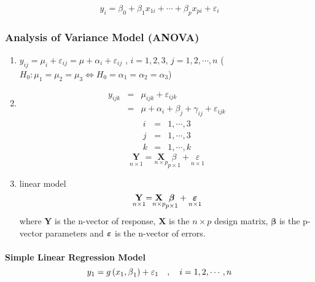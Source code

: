 \documentclass{article}
\begin{document}
\begin{equation*}
y_{i}=\beta _{0}+\beta _{1}x_{1i}+\cdots +\beta _{p}x_{pi}+\varepsilon _{i}
\end{equation*}

\subsubsection{Analysis of Variance Model (ANOVA)}

\begin{enumerate}
\item $y_{ij}=\mu _{i}+\varepsilon _{ij}=\mu +\alpha _{i}+\varepsilon _{ij}$%
, $i=1,2,3$, $j=1,2,\cdots ,n$\newline
($H_{0}:\mu _{1}=\mu _{2}=\mu _{3}\Longleftrightarrow H_{0}=\alpha
_{1}=\alpha _{2}=\alpha _{3}$)

\item 
\begin{eqnarray*}
y_{ijk} &=&\mu _{ijk}+\varepsilon _{ijk} \\
&=&\mu +\alpha _{i}+\beta _{j}+\gamma _{ij}+\varepsilon _{ijk}
\end{eqnarray*}%
\begin{eqnarray*}
i &=&1,\cdots ,3 \\
j &=&1,\cdots ,3 \\
k &=&1,\cdots ,k
\end{eqnarray*}%
\begin{equation*}
\underset{n\times 1}{\mathbf{Y}}\mathbf{=}\underset{n\times p}{\mathbf{X}}%
\underset{p\times 1}{\beta }+\underset{n\times 1}{\varepsilon }
\end{equation*}

\item linear model%
\begin{equation*}
\underset{n\times 1}{\mathbf{Y}}\mathbf{=}\underset{n\times p}{\mathbf{X}}%
\underset{p\times 1}{\mathbf{\beta }}+\underset{n\times 1}{\mathbf{%
\varepsilon }}
\end{equation*}%
where $\mathbf{Y}$ is the n-vector of response, $\mathbf{X}$ is the $n\times
p$ design matrix, $\mathbf{\beta }$ is the p-vector parameters and $\mathbf{%
\varepsilon }$ is the n-vector of errors.
\end{enumerate}

\bigskip 

\paragraph{Simple Linear Regression Model%
\protect\begin{equation*}
y_{1}=g\left( x_{1},\protect\beta _{1}\right) +\protect\varepsilon _{1}\quad
,\quad i=1,2,\cdots ,n
\protect\end{equation*}%
}
\end{document}
